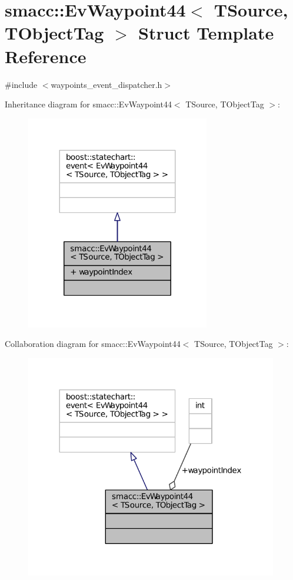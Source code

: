 \hypertarget{structsmacc_1_1EvWaypoint44}{}\section{smacc\+:\+:Ev\+Waypoint44$<$ T\+Source, T\+Object\+Tag $>$ Struct Template Reference}
\label{structsmacc_1_1EvWaypoint44}


{\ttfamily \#include $<$waypoints\+\_\+event\+\_\+dispatcher.\+h$>$}



Inheritance diagram for smacc\+:\+:Ev\+Waypoint44$<$ T\+Source, T\+Object\+Tag $>$\+:
\nopagebreak
\begin{figure}[H]
\begin{center}
\leavevmode
\includegraphics[width=227pt]{structsmacc_1_1EvWaypoint44__inherit__graph}
\end{center}
\end{figure}


Collaboration diagram for smacc\+:\+:Ev\+Waypoint44$<$ T\+Source, T\+Object\+Tag $>$\+:
\nopagebreak
\begin{figure}[H]
\begin{center}
\leavevmode
\includegraphics[width=312pt]{structsmacc_1_1EvWaypoint44__coll__graph}
\end{center}
\end{figure}
